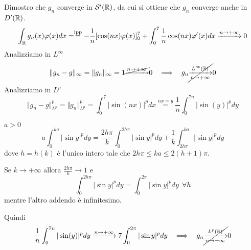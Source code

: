 Dimostro che $g_{n}$ converge in $\mathcal{S}  '(\mathbb{R})$, da cui si ottiene che $g_{n}$ converge anche in $D'(\mathbb{R})$.
\begin{equation*}
\int _{\mathbb{R} } g_{n}(x) \varphi (x) dx = \overset{\text{ipp}}{ = } - \frac{1}{n}[\cos(nx) \varphi (x)]^{7}_{0} + \int ^{7}_{0}\frac{1}{n}\cos(nx) \varphi '(x) dx\xrightarrow{n\rightarrow + \infty } 0
\end{equation*}
Analizziamo in $L^{\infty }$
\begin{equation*}
\Vert g_{n} - g\Vert _{\infty } = \Vert g_{n}\Vert _{\infty } = 1\cancel{\xrightarrow{n\rightarrow + \infty }} 0\ \ \implies \ \ g_{n}\cancel{\xrightarrow[n\rightarrow + \infty ]{L^{\infty }(\mathbb{R})}} 0
\end{equation*}
Analizziamo in $L^{p}$
\begin{equation*}
\Vert g_{n} - g\Vert ^{p}_{L^{p}} = \Vert g_{n}\Vert ^{p}_{L^{p}} = \int ^{7}_{0}| \sin(nx)| ^{p} dx\overset{nx = y}{ = }\frac{1}{n}\int ^{7n}_{0}| \sin(y)| ^{p} dy
\end{equation*}
\begin{rem}
$a > 0$
\begin{equation*}
a\int ^{ka}_{0}| \sin y| ^{p} dy = \frac{2h\pi }{k}\int ^{2h\pi }_{0}| \sin y| ^{p} dy + \frac{1}{k}\int ^{ka}_{2h\pi }| \sin y| ^{p} dy
\end{equation*}
dove $h = h(k)$ è l'unico intero tale che $2h\pi \leq ka\leq 2(h + 1) \pi $.

Se $k\rightarrow + \infty $ allora $\frac{2h\pi }{k}\rightarrow 1$ e
\begin{equation*}
\int ^{2h\pi }_{0}| \sin y| ^{p} dy = \int ^{2\pi }_{0}| \sin y| ^{p} dy\ \ \forall h
\end{equation*}
mentre l'altro addendo è infinitesimo.
\end{rem}
Quindi
\begin{equation*}
\frac{1}{n}\int ^{7n}_{0}| \sin(y)| ^{p} dy\xrightarrow{n\rightarrow + \infty } 7\int ^{2\pi }_{0}| \sin y| ^{p} dy\ \ \implies \ \ g_{n}\cancel{\xrightarrow[n\rightarrow + \infty ]{L^{p}(\mathbb{R})}} 0
\end{equation*}
\Soluzione
